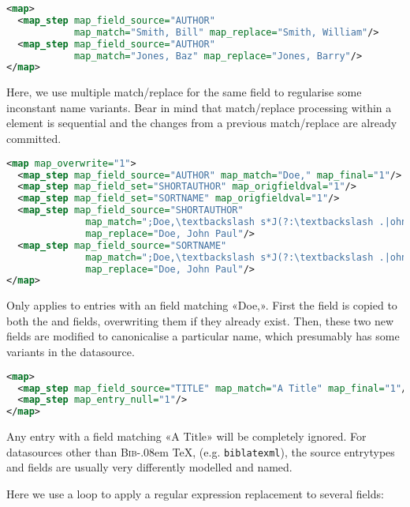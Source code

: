 \documentclass{ltxdockit}
\def\BibTeX{\textsc{Bib}\kern-.08em \TeX}
\begin{document}
\begin{lstlisting}[language=xml,escapechar=:,mathescape=true]
<map>
  <map_step map_field_source="AUTHOR"
            map_match="Smith, Bill" map_replace="Smith, William"/>
  <map_step map_field_source="AUTHOR"
            map_match="Jones, Baz" map_replace="Jones, Barry"/>
</map>
\end{lstlisting}

\noindent Here, we use multiple match/replace for the same field to
regularise some inconstant name variants. Bear in mind that
match/replace processing within a  element is sequential and
the changes from a previous match/replace are already committed.

\begin{lstlisting}[language=xml,escapechar=;,mathescape=true]
<map map_overwrite="1">
  <map_step map_field_source="AUTHOR" map_match="Doe," map_final="1"/>
  <map_step map_field_set="SHORTAUTHOR" map_origfieldval="1"/>
  <map_step map_field_set="SORTNAME" map_origfieldval="1"/>
  <map_step map_field_source="SHORTAUTHOR"
              map_match=";Doe,\textbackslash s*J(?:\textbackslash .|ohn)(?:[-]*)(?:P\textbackslash .|Paul)*;"
              map_replace="Doe, John Paul"/>
  <map_step map_field_source="SORTNAME"
              map_match=";Doe,\textbackslash s*J(?:\textbackslash .|ohn)(?:[-]*)(?:P\textbackslash .|Paul)*;"
              map_replace="Doe, John Paul"/>
</map>
\end{lstlisting}

\noindent Only applies to entries with an  field matching
«Doe,». First the  field is copied to both the
 and  fields, overwriting them if they
already exist. Then, these two new fields are modified to canonicalise a
particular name, which presumably has some variants in the datasource.

\begin{lstlisting}[language=xml,escapechar=;,mathescape=true]
<map>
  <map_step map_field_source="TITLE" map_match="A Title" map_final="1"/>
  <map_step map_entry_null="1"/>
</map>
\end{lstlisting}

\noindent Any entry with a  field matching «A Title» will
be completely ignored. \bigskip {} For
datasources other than \BibTeX, (e.g. \verb+biblatexml+), the source
entrytypes and fields are usually very differently modelled and named.

\noindent Here we use a loop to apply a regular expression replacement to
several fields:
\end{document}
